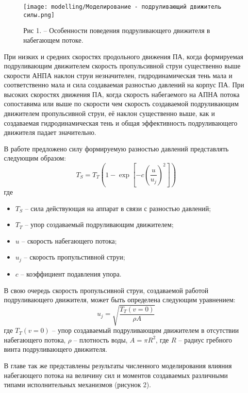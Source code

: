 \begin{figure}[ht]
    \centering
    \texttt{[image: modelling/Моделирование - подруливающий движитель силы.png]}
    \caption*{Рис 1. -- Особенности поведения подруливающего движителя в набегающем потоке.}
    \label{fig:modelling-tunnel}
\end{figure}

При низких и средних скоростях продольного движения ПА, когда формируемая подруливающим движителем скорость пропульсивной струи существенно выше скорости АНПА наклон струи незначителен, гидродинамическая тень мала и соответственно мала и сила создаваемая разностью давлений на корпус ПА.
При высоких скоростях движения ПА, когда скорость набегаемого на АПНА потока сопоставима или выше по скорости чем скорость создаваемой подруливающим движителем пропульсивной струи, её наклон существенно выше, как и создаваемая гидродинамическая тень и общая эффективность подруливающего движителя падает значительно.

В работе \cite{palmer2009analysis} предложено силу формируемую разностью давлений представлять следующим образом:
\begin{equation}
    \label{eq:thrust_tunnel}
    T_S = T_T (1 - \exp \left[ -c \left( \frac{u}{u_j} \right)^2 \right])
\end{equation}
\noindent где
\begin{itemize}
    \item $T_S$ -- сила действующая на аппарат в связи с разностью давлений;
    \item $T_T$ -- упор создаваемый подруливающим движителем;
    \item $u$ -- скорость набегающего потока;
    \item $u_j$ -- скорость пропульстивной струи;
    \item $c$ -- коэффициент подавления упора.
\end{itemize}

В свою очередь скорость пропульсивной струи, создаваемой работой подруливающего движителя, может быть определена следующим уравнением:
\begin{equation}
    \label{eq:jetflow_speed}
    u_j = \sqrt{\frac{T_T(v=0)}{\rho A}}
\end{equation}
\noindent где $T_T(v=0)$ -- упор создаваемый подруливающим движителем в отсутствии набегающего потока, $\rho$ -- плотность воды, $A=\pi R^2$, где $R$ -- радиус гребного винта подруливающего движителя.

В главе так же представлены результаты численного моделирования влияния набегающего потока на величину сил и моментов создаваемых различными типами исполнительных механизмов (рисунок 2).


